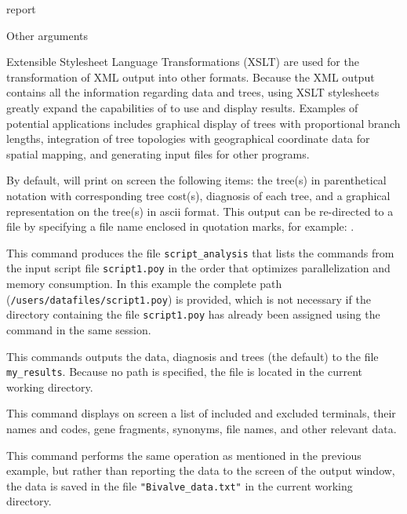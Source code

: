 \begin{command}{report}{}
\begin{arguments}
\begin{argumentgroup}{Other arguments}
\begin{statement}
Extensible Stylesheet Language Transformations (XSLT) are used
for the transformation of XML output into other formats. Because the XML 
output contains all the information regarding data and trees, using XSLT 
stylesheets greatly expand the capabilities of \poy to use and display results.
Examples of potential applications includes graphical display of trees with 
proportional branch lengths, integration of tree topologies with geographical 
coordinate data for spatial mapping, and generating input files for other programs.
\end{statement}

\end{argumentgroup}
\end{arguments}

{By default, \poy will print on screen the following items: the tree(s)
in parenthetical notation with corresponding tree cost(s), diagnosis of
each tree, and a graphical representation on the tree(s) in ascii
format. This output can be re-directed to a file by specifying a file
name enclosed in quotation marks, for example:
.}

\begin{poyexamples} 

{This command produces the file \texttt{script\_analysis} that lists the commands from
the input script file \texttt{script1.poy} in the order that optimizes parallelization and
memory consumption. In this example the complete path (\texttt{/users/datafiles/script1.poy})
is provided, which is not necessary if the directory containing the file \texttt{script1.poy}
has already been assigned using the command  in the same \poy session.}

{This commands outputs the data, diagnosis and trees (the default) to the
file \texttt{my\_results}. Because no path is specified, the
file is located in the current working directory.}

{This command displays on screen a list of included and excluded terminals, their
names and codes, gene fragments, synonyms, file names, and other relevant data.}

{This command performs the same operation as mentioned in the previous example,
but rather than reporting the data to the screen of the output window, the data
is saved in the file \texttt{"Bivalve\_data.txt"} in the current working directory.}


\end{poyexamples}
\end{command}
